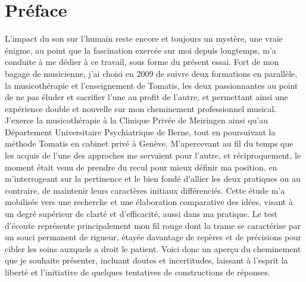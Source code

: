 
\chapter*{Préface}
 L'impact du son sur l'humain reste encore et toujours un mystère, une vraie énigme, au point que la 
 fascination exercée  sur moi depuis longtemps, m'a conduite à me dédier à ce travail, sous forme du 
 présent essai.
 Fort de mon bagage de musicienne, j'ai choisi en 2009  de suivre deux formations en parallèle,  
 la musicothérapie et l'enseignement de  Tomatis, les deux passionnantes au point de ne pas éluder et 
 sacrifier l'une au profit de l'autre, et permettant ainsi une expérience double et nouvelle sur mon 
 cheminement professionnel musical.
 J'exerce  la musicothérapie à la Clinique Privée de Meiringen ainsi qu'au 
 Département 
 Universitaire Psychiatrique de Berne, tout en poursuivant  la méthode 
 Tomatis en cabinet privé à Genève. M'apercevant au fil du temps que les 
 acquis de l'une des approches me servaient  pour l'autre, et réciproquement, le moment était venu de 
 prendre du recul pour mieux 
 définir ma position, en  m'interrogeant  sur la pertinence et le bien fondé d'allier les deux pratiques 
 ou au contraire, de maintenir  leurs caractères initiaux différenciés.  Cette étude m'a mobilisée vers une 
 recherche et une élaboration comparative  des idées, visant à un degré supérieur de clarté et d'efficacité, 
 aussi dans ma pratique.
 Le test d'écoute représente principalement mon fil rouge dont la trame se caractérise par un souci 
 permanent de rigueur, étayée davantage de repères et de précisions  pour cibler les 
 soins auxquels a droit le patient.
 Voici donc un aperçu du cheminement que je souhaite présenter, incluant doutes et incertitudes,
  laissant à l'esprit la liberté et l'initiative de quelques tentatives de constructions de réponses.

